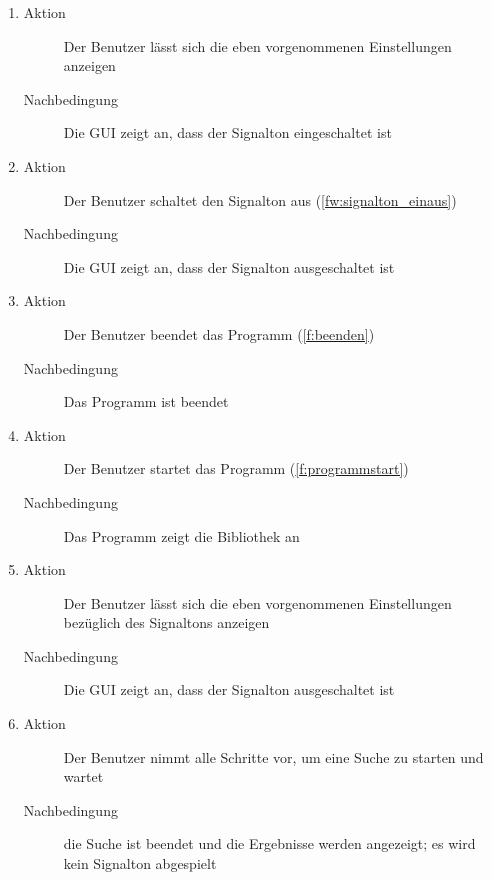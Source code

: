 \begin{enumerate} [label=\bfseries /TSW \arabic*0/, leftmargin=*]
\begin{enumerate}[leftmargin=0pt]
		\item
		\begin{description}
			\item[Aktion] Der Benutzer lässt sich die eben vorgenommenen Einstellungen anzeigen
			\item[Nachbedingung] Die \gls{GUI} zeigt an, dass der Signalton eingeschaltet ist
		\end{description}
		\item
		\begin{description}
			\item[Aktion] Der Benutzer schaltet den Signalton aus (\ref{fw:signalton_einaus})
			\item[Nachbedingung] Die \gls{GUI} zeigt an, dass der Signalton ausgeschaltet ist
		\end{description}
		\item
		\begin{description}
			\item[Aktion] Der Benutzer beendet das Programm (\ref{f:beenden})
			\item[Nachbedingung] Das Programm ist beendet
		\end{description}
		\item
		\begin{description}
			\item[Aktion] Der Benutzer startet das Programm (\ref{f:programmstart})
			\item[Nachbedingung] Das Programm zeigt die Bibliothek an
		\end{description}
		\item
		\begin{description}
			\item[Aktion] Der Benutzer lässt sich die eben vorgenommenen Einstellungen bezüglich des Signaltons anzeigen
			\item[Nachbedingung] Die \gls{GUI} zeigt an, dass der Signalton ausgeschaltet ist
		\end{description}
		\item
		\begin{description}
			\item[Aktion] Der Benutzer nimmt alle Schritte vor, um eine Suche zu starten und wartet
			\item[Nachbedingung] die Suche ist beendet und die Ergebnisse werden angezeigt; es wird kein Signalton abgespielt
		\end{description}
	\end{enumerate}


\end{enumerate}
